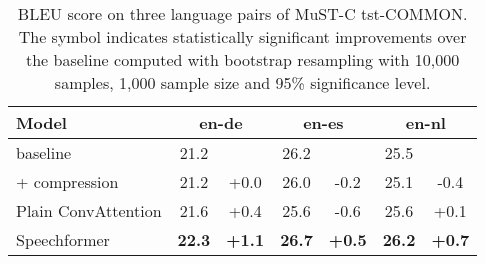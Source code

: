 \documentclass[11pt]{article}
\begin{document}
\begin{table}[t]
\setlength{\tabcolsep}{2.5pt}
\centering
\small
\begin{tabular}{l|cc|cc|cc}
 \hline
 \textbf{Model} & 
\multicolumn{2}{c|}{\textbf{en-de}} &  
  \multicolumn{2}{c|}{\textbf{en-es}} & 
  \multicolumn{2}{c}{\textbf{en-nl}} 
 \\
 \hline
 baseline & 21.2 & & 26.2 & & 25.5 & \\
 \hspace{0.3cm} + compression & 21.2 & +0.0 & 26.0 & -0.2 & 25.1 & -0.4 \\
 \hline
 Plain ConvAttention & 21.6 & +0.4 & 25.6 & -0.6 & 25.6 & +0.1 \\
 Speechformer & \textbf{22.3} & \textbf{+1.1} & \textbf{26.7} & \textbf{+0.5} & \textbf{26.2} & \textbf{+0.7} \\
 \hline
\end{tabular}
\caption{BLEU score on three language pairs of MuST-C tst-COMMON. The  symbol indicates statistically significant improvements over the baseline computed with bootstrap resampling \cite{koehn-2004-statistical} with 10,000 samples, 1,000 sample size and 95\% significance level.
}
\label{tab:results_ls}
\end{table}
\end{document}
